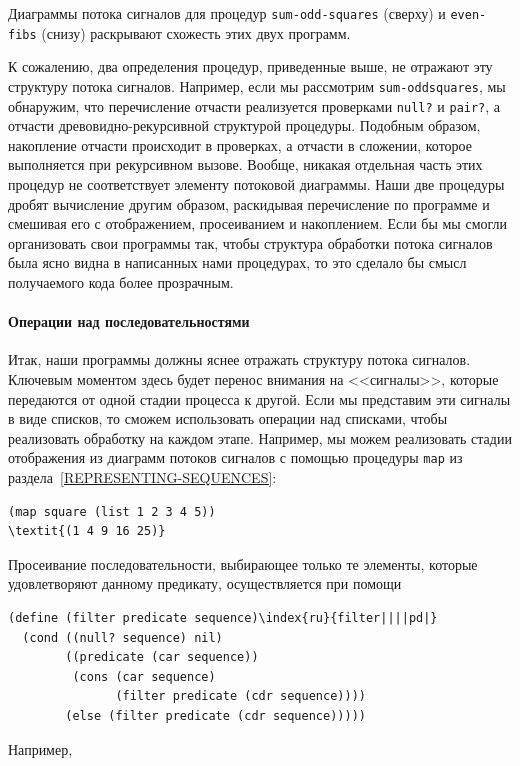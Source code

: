 \begin{cntrfig}

\caption{Диаграммы потока сигналов для процедур
{\tt sum-odd-squares} (сверху) и {\tt even-fibs} (снизу) 
раскрывают схожесть этих двух программ.}
\label{P2.7}

\end{cntrfig}

{К сожалению, два определения процедур, приведенные выше, не 
отражают эту структуру потока сигналов.  Например, если мы рассмотрим
{\tt sum-odd\-squares}, мы обнаружим, что перечисление отчасти %
реализуется проверками {\tt null?} и {\tt pair?}, а отчасти 
древовидно-рекурсивной структурой процедуры.  Подобным образом,
накопление отчасти происходит в проверках, а отчасти в сложении,
которое выполняется при рекурсивном вызове.  Вообще, никакая отдельная
часть этих процедур не соответствует элементу потоковой диаграммы.  Наши
две процедуры дробят вычисление другим образом, раскидывая
перечисление по программе и смешивая его с отображением, просеиванием
и накоплением. Если бы мы смогли организовать свои программы так,
чтобы структура обработки потока сигналов была ясно видна в написанных нами
процедурах, то это сделало бы смысл получаемого кода более прозрачным.

\sloppy
}
\paragraph{Операции над последовательностями}

Итак, наши программы должны
яснее отражать структуру 
потока сигналов. Ключевым моментом здесь будет перенос внимания на
<<сигналы>>, которые передаются от одной стадии процесса к другой.  Если 
мы представим эти сигналы в виде списков, то сможем использовать
операции над списками, чтобы реализовать обработку на каждом этапе.
Например, мы можем реализовать стадии отображения из диаграмм потоков
сигналов с помощью процедуры {\tt map} из раздела~\ref{REPRESENTING-SEQUENCES}:

\begin{Verbatim}[fontsize=\small]
(map square (list 1 2 3 4 5))
\textit{(1 4 9 16 25)}
\end{Verbatim}

Просеивание последовательности, выбирающее только
те элементы, которые удовлетворяют данному предикату, осуществляется
при помощи

\begin{Verbatim}[fontsize=\small]
(define (filter predicate sequence)\index{ru}{filter||||pd|}
  (cond ((null? sequence) nil)
        ((predicate (car sequence))
         (cons (car sequence)
               (filter predicate (cdr sequence))))
        (else (filter predicate (cdr sequence)))))
\end{Verbatim}
Например,

